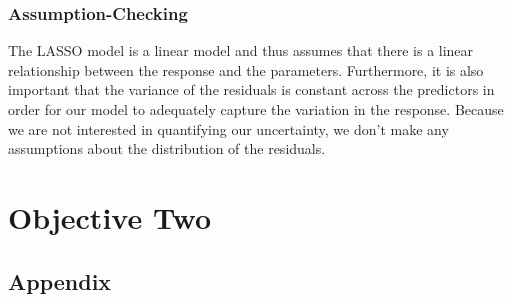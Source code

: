 \documentclass[american,]{article}
\begin{document}
\subsubsection{Assumption-Checking}\label{assumption-checking}

The LASSO model is a linear model and thus assumes that there is a
linear relationship between the response and the parameters.
Furthermore, it is also important that the variance of the residuals is
constant across the predictors in order for our model to adequately
capture the variation in the response. Because we are not interested in
quantifying our uncertainty, we don't make any assumptions about the
distribution of the residuals.

\section{Objective Two}\label{objective-two}

\renewcommand\refname{Conclusion}


\begin{appendices}
\section{Appendix}
  
\end{appendices}
\end{document}
